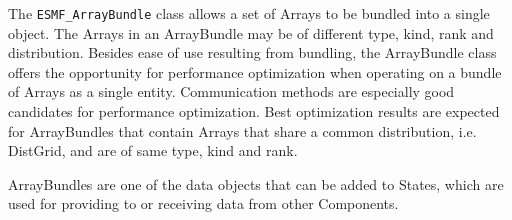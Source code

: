 
The {\tt ESMF\_ArrayBundle} class allows a set of Arrays to be bundled into a
single object. The Arrays in an ArrayBundle may be of different type, kind,
rank and distribution. Besides ease of use resulting from bundling, the
ArrayBundle class offers the opportunity for performance optimization when
operating on a bundle of Arrays as a single entity.  Communication methods are 
especially good candidates for performance optimization. Best optimization
results are expected for ArrayBundles that contain Arrays that share a common
distribution, i.e. DistGrid, and are of same type, kind and rank.

ArrayBundles are one of the data objects that can be added to States,
which are used for providing to or receiving data from other Components.
